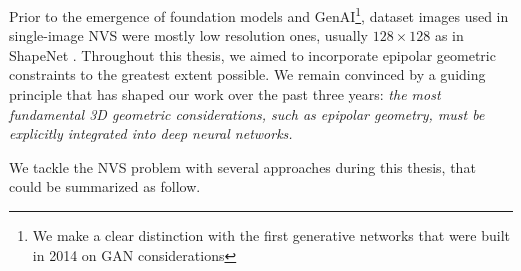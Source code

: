 Prior to the emergence of foundation models \citep{awais2023foundational} and \ac{GenAI}\footnote{We make a clear distinction with the first generative networks that were built in 2014 on \ac{GAN} \citep{goodfellow2014generative} considerations}, dataset images used in single-image \ac{NVS} were mostly low resolution ones, usually $128\times128$ as in ShapeNet \citep{chang2015shapenet}. Throughout this thesis, we aimed to incorporate epipolar geometric constraints to the greatest extent possible. We remain convinced by a guiding principle that has shaped our work over the past three years: \textit{the most fundamental 3D geometric considerations, such as epipolar geometry, must be explicitly integrated into deep neural networks.}

We tackle the \ac{NVS} problem with several approaches during this thesis, that could be summarized as follow.
